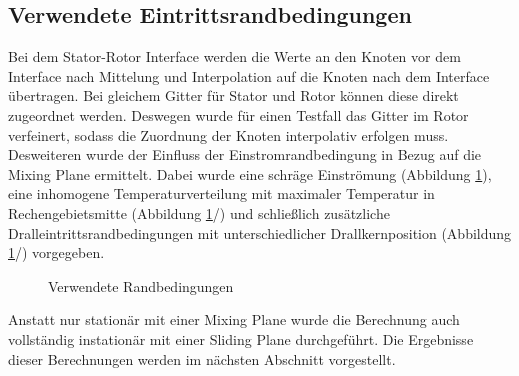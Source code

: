 \subsection{Verwendete Eintrittsrandbedingungen}
\label{subsec:kanalrandbedingungen}
Bei dem Stator-Rotor Interface werden die Werte an den Knoten vor dem Interface nach Mittelung und Interpolation auf die Knoten nach dem Interface übertragen. Bei gleichem Gitter für Stator und Rotor können diese direkt zugeordnet werden. Deswegen wurde für einen Testfall das Gitter im Rotor verfeinert, sodass die Zuordnung der Knoten interpolativ erfolgen muss.\newline
Desweiteren wurde der Einfluss der Einstromrandbedingung in Bezug auf die Mixing Plane ermittelt. Dabei wurde eine schräge Einströmung (Abbildung \ref{fig:randbedingungen}), eine inhomogene Temperaturverteilung mit maximaler Temperatur in Rechengebietsmitte (Abbildung \ref{fig:randbedingungen}/) und schließlich zusätzliche Dralleintrittsrandbedingungen mit unterschiedlicher Drallkernposition (Abbildung \ref{fig:randbedingungen}/) vorgegeben.
\begin{figure}[htbp]
\centering
\caption{Verwendete Randbedingungen}
\label{fig:randbedingungen}
\end{figure} 
Anstatt nur stationär mit einer Mixing Plane wurde die Berechnung auch vollständig instationär mit einer Sliding Plane durchgeführt. Die Ergebnisse dieser Berechnungen werden im nächsten Abschnitt vorgestellt.
